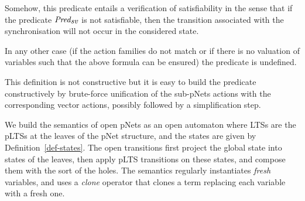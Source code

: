 \documentclass{llncs}
\begin{document}
Somehow, this predicate entails a verification of satisfiability in the sense that if the 
predicate $\Pred_{\symb{sv}}$ is not satisfiable, then the transition associated with the 
synchronisation will not occur in the considered state. 


In any other case (if the action families do not match or if there is no valuation of
variables such that the above formula can be ensured) the predicate is undefined.

This definition is not constructive but it is easy to build the predicate constructively
by brute-force unification of the sub-pNets
actions with the corresponding vector actions, possibly followed by a simplification
step.


We build the semantics of open pNets as an open automaton where LTSs are the pLTSs at
the leaves of the pNet structure, and the states are given by 
Definition~\ref{def-states}. The open transitions first
 project the global state into states of the leaves, then apply
pLTS transitions on these states, and compose them with the sort of the holes. %
The semantics   regularly instantiates \emph{fresh} variables, and uses a
\emph{clone} operator that clones a term replacing each variable with a
fresh one.
\end{document}
